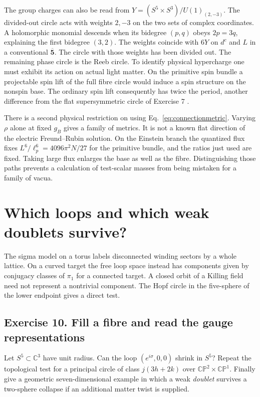 \documentclass[10pt]{article}
\begin{document}
The group charges can also be read from $Y=(S^5\times S^3)/U(1)_{(2,-3)}$. The divided-out circle acts with weights $2,-3$ on the two sets of complex coordinates. A holomorphic monomial descends when its bidegree $(p,q)$ obeys $2p=3q$, explaining the first bidegree $(3,2)$. The weights coincide with $6Y$ on $d^c$ and $L$ in a conventional $\overline{\mathbf5}$. The circle with those weights has been divided out. The remaining phase circle is the Reeb circle. To identify physical hypercharge one must exhibit its action on actual light matter. On the primitive spin bundle a projectable spin lift of the full fibre circle would induce a spin structure on the nonspin base. The ordinary spin lift consequently has twice the period, another difference from the flat supersymmetric circle of Exercise 7 \cite{SevenMTheory2026}.

There is a second physical restriction on using Eq.~\eqref{eq:connectionmetric}. Varying $\rho$ alone at fixed $g_B$ gives a family of metrics. It is not a known flat direction of the electric Freund--Rubin solution. On the Einstein branch the quantized flux fixes $L^6/\ell_p^6=4096\pi^2N/27$ for the primitive bundle, and the ratios just used are fixed. Taking large flux enlarges the base as well as the fibre. Distinguishing those paths prevents a calculation of test-scalar masses from being mistaken for a family of vacua.

\section{Which loops and which weak doublets survive?}

The sigma model on a torus labels disconnected winding sectors by a whole lattice. On a curved target the free loop space instead has components given by conjugacy classes of $\pi_1$ for a connected target. A closed orbit of a Killing field need not represent a nontrivial component. The Hopf circle in the five-sphere of the lower endpoint gives a direct test.

\subsection{Exercise 10. Fill a fibre and read the gauge representations}
Let $S^5\subset\mathbb C^3$ have unit radius. Can the loop $(e^{i\sigma},0,0)$ shrink in $S^5$? Repeat the topological test for a principal circle of class $j(3h+2k)$ over $\mathbb{CP}^2\times\mathbb{CP}^1$. Finally give a geometric seven-dimensional example in which a weak \emph{doublet} survives a two-sphere collapse if an additional matter twist is supplied.
\end{document}
